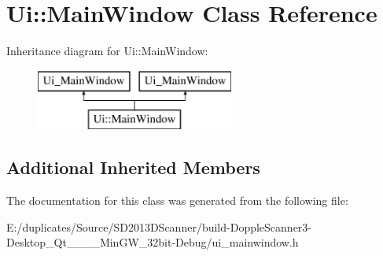 \hypertarget{class_ui_1_1_main_window}{\section{Ui\-:\-:Main\-Window Class Reference}
\label{class_ui_1_1_main_window}
}
Inheritance diagram for Ui\-:\-:Main\-Window\-:\begin{figure}[H]
\begin{center}
\leavevmode
\includegraphics[height=2.000000cm]{class_ui_1_1_main_window}
\end{center}
\end{figure}
\subsection*{Additional Inherited Members}


The documentation for this class was generated from the following file\-:\begin{DoxyCompactItemize}
\item 
E\-:/duplicates/\-Source/\-S\-D2013\-D\-Scanner/build-\/\-Dopple\-Scanner3-\/\-Desktop\-\_\-\-Qt\-\_\-\_\-\_\-\_\-\-Min\-G\-W\-\_\-32bit-\/\-Debug/ui\-\_\-mainwindow.\-h\end{DoxyCompactItemize}
